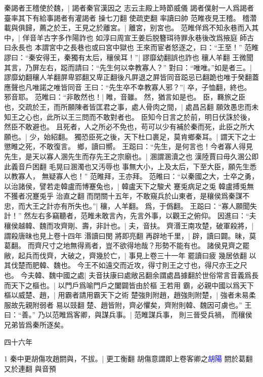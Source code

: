 秦謁者王稽使於魏，|{
	謁者秦官漢因之
	志云主殿上時節威儀
	謁者僕射一人爲謁者臺率其下有給事謁者有灌謁者
	操七刀翻
	使疏吏翻
	率讀曰帥
	}
范睢夜見王稽。
稽濳載與俱歸，薦之於王，王見之於離宮。|{
	離宮，别宮也。
	}
范睢佯爲不知永巷而入其中，|{
	佯音羊古字多作陽詐也
	如淳曰周宣王姜后脱簪珥待罪永巷後改爲掖庭
	師古曰永長也
	本謂宮中之長巷也或曰宮中獄也}
王來而宦者怒逐之，曰：“王至！”
范睢謬曰：“秦安得王，秦獨有太后，穰侯耳！”|{
	謬靡幼翻誤也詐也
	穰人羊翻}
王微聞其言，乃屏左右，跽而請曰：“先生何以幸教寡人？”
對曰：“唯唯。”如是者三。|{
	謬靡幼翻穰人羊翻屏卑郢翻又卑正翻後凡屛退之屛皆同音跽忌已翻跪也唯于癸翻蓋應聲也凡唯諾之唯皆同音}
王曰：“先生卒不幸教寡人邪？”|{
	卒，子恤翻，終也。
	邪音耶。
	}
范睢曰：“非敢然也！|{
	睢，音雖。
	然，猶言如是也。
	}
臣，羇旅之臣也，交疏於王，而所願陳者皆匡君之事，處人骨肉之間，|{
	處昌呂翻
	}
願效愚忠而未知王之心也，此所以王三問而不敢對者也。
臣知今日言之於前，明日伏誅於後，然臣不敢避也。
且死者，人之所必不免也，苟可以少有補於秦而死，此臣之所大願也。|{
	少，始紹翻。
	}
獨恐臣死之後，天下杜口裹足，莫肯鄉秦耳。|{
	謂天下之士懲睢之死，不敢復言。
	鄉，讀曰嚮。
	}
王跽曰：“先生，是何言也！今者寡人得見先生，是天以寡人溷先生而存先王之宗廟也。|{
	溷謂溷瀆之也
	漢陸賈曰毋久溷公即此義音戶困翻
	毛晃曰溷濁也又汚辱也
	}
事無大小，上及太后，下至大臣，願先生悉以教寡人，
無疑寡人也！”
范睢拜，王亦拜。
范睢曰：“以秦國之大，士卒之勇，以治諸侯，譬若走韓盧而博蹇兔也，|{%
	韓盧天下之駿犬
	蹇兎病足之兎
	韓盧搏兎無不獲者况蹇兎乎
	治直之翻
	}
而閉關十五年，不敢窺兵於山東者，是穰侯爲秦謀不忠，而大王之計亦有所失也。”|{
	穰，人羊翻。
	爲，于僞翻。
	}
王跽曰：“寡人願聞失計！”
然左右多竊聽者，范睢未敢言內，先言外事，以觀王之俯仰。
因進曰：“夫穰侯越韓、魏而攻齊剛、壽，非計也。|{
	夫，音扶。
	}
齊湣王南攻楚，破軍殺將，|{
	謂殺唐昧也見上卷十四年
	湣讀曰閔
	將即亮翻
	}
再辟地千里，|{
	辟，讀曰闢。昧，莫葛翻。
	}
而齊尺寸之地無得焉者，豈不欲得地哉？形勢不能有也。
諸侯見齊之罷敝，起兵而伐齊，大破之，齊幾於亡，|{
	事見上卷三十一年
	罷讀曰疲
	幾居依翻
	}
以其伐楚而肥韓、魏也。
今王不如遠交而近攻，得寸則王之寸也，得尺亦王之尺也。
今夫韓、魏中國之處|{
	夫音扶康曰處敞呂翻余謂處昌據翻於世俗常言音義爲長}
而天下之樞也。|{
	以門戶爲喻門戶之闔闢皆由於樞}
王若用%
霸，必親中國以爲天下樞以威楚、趙，|{
	用霸者請用霸天下之術}
楚強則附趙，趙強則附楚，|{
	強者未易柔服故先親附弱者
	易以豉翻}
楚、趙皆附，齊必懼矣，齊附則韓、魏因可虜也。”
王曰：“善。”
乃以范睢爲客卿，與謀兵事。|{
	范睢謀兵事，
	則三晉受兵禍，
	而穰侯兄弟皆爲秦所逐矣。
	}


四十六年

1 秦中更胡傷攻趙閼與，不拔。|{
	更工衡翻
	胡傷意謂即上卷客卿之\textcolor{blue}{胡陽}
	閼於葛翻又於連翻
	與音預
	}


